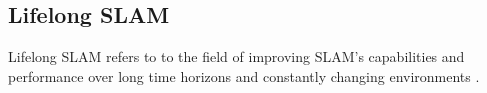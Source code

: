 \subsection{Lifelong SLAM}

Lifelong SLAM refers to to the field of improving SLAM's capabilities and performance over long time horizons and constantly changing environments \cite{shiAreWeReady2020}. 
